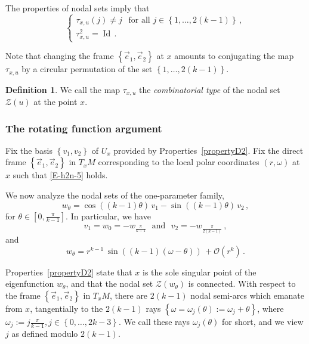 \documentclass[12pt,a4paper]{amsart}
\theoremstyle{plain} %
\theoremstyle{definition}
\newtheorem{definition}[theorem]{Definition}
\numberwithin{equation}{section}
\numberwithin{figure}{section}
\numberwithin{table}{section}
\newcommand{\cZ}{\mathcal{Z}}
\DeclareMathOperator{\id}{Id}
\newcommand{\set}[1]{\left\lbrace #1 \right\rbrace}
\begin{document}
The properties of nodal sets imply that
%
\begin{equation}\label{E-h2n-taup}
\left\{
\begin{array}{l}
\tau_{x,u}(j) \neq j ~~ \text{~for all~} j \in \set{1,\ldots,
2(k-1)}\,,\\[5pt]
\tau_{x,u}^2 = \id\,.
\end{array}%
\right.
\end{equation}

Note that changing the frame $\set{\vec{e}_1,\vec{e}_2}$ at $x$ amounts to conjugating the map $\tau_{x,u}$ by a circular permutation of the set  $\set{1,\ldots,2(k-1)}$.

\begin{definition}\label{D-h2n-type}
We call the map $\tau_{x,u}$ the \emph{combinatorial type} of the nodal set $\cZ(u)$ at the point $x$.
\end{definition}%

\subsubsection{The rotating function argument}\label{SSS-h2n-s2r}

Fix the basis $\set{v_1,v_2}$ of $U_x$ provided by Properties~\ref{propertyD2}.  Fix the direct frame $\set{\vec{e}_1, \vec{e}_2}$ in $T_xM$ corresponding to the local polar coordinates $(r,\omega)$ at $x$ such that \eqref{E-h2n-5} holds.\smallskip

We now analyze the nodal sets of the one-parameter family,
%
\begin{equation}\label{E-h2n-6a}
w_\theta = \cos((k-1) \theta) \,v_1 - \sin((k-1) \theta) \, v_2\,,
\end{equation}
%
for $\theta \in \left[ 0, \frac{\pi}{k-1}\right]$. In particular, we have
%
\begin{equation}\label{E-h2n-6b}
v_1 = w_0 = - w_{\frac{\pi}{k-1}} \text{~~and~~} v_2 = - w_{\frac{\pi}{2(k-1)}}\,,
\end{equation}
%
and
%
\begin{equation}\label{E-h2n-6c}
w_\theta = r^{k-1}\, \sin((k-1)(\omega - \theta)) \, +\mathcal O (r^k)\,.
\end{equation}

Properties~\ref{propertyD2} state that $x$ is the sole singular point of the eigenfunction $w_{\theta}$, and that the nodal set $\cZ(w_{\theta})$ is connected. With respect to the frame $\set{\vec{e}_1, \vec{e}_2}$ in $T_xM$, there are $2(k-1)$ nodal semi-arcs which emanate from $x$, tangentially to the $2(k-1)$ rays $\set{\omega = \omega_j(\theta) := \omega_j + \theta}$, where $\omega_j :=j \frac{\pi}{k-1}, j \in \set{0,\ldots,2k-3}$. We call these rays $\omega_j(\theta)$ for short, and we view $j$ as defined modulo $2(k-1)$.\medskip
\end{document}
